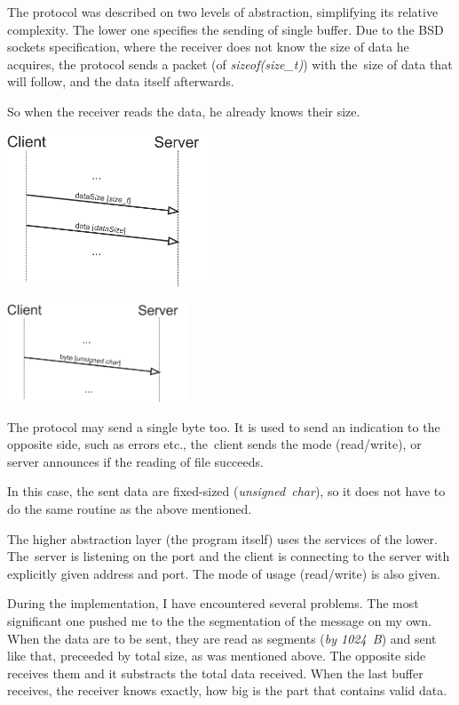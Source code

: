 \documentclass[10pt,a4paper,titlepage]{article}
\begin{document}

\begin{multicols}{2}
The protocol was described on two levels of abstraction, simplifying its
relative complexity. The lower one specifies the sending of single
buffer. Due to the BSD sockets specification, where the receiver
does not know the size of data he acquires, the protocol sends a packet
(of {\it sizeof(size\_t)}) with the~size of data that will follow,
and the data itself afterwards.

So when the receiver reads the data, he already knows their size.

\includegraphics[width=0.45\textwidth]{send_data.png}
\end{multicols}


\begin{multicols}{2}
\includegraphics[width=0.4\textwidth]{send_byte.png}

The protocol may send a single byte too. It is used to send an indication
to the opposite side, such as errors etc., the~client sends the mode
(read/write), or server announces if the reading of file succeeds.

In this case, the sent data are fixed-sized ({\it unsigned~char}),
so it does not have to do the same routine as the above mentioned.
\end{multicols}


The higher abstraction layer (the program itself) uses the services of the
lower. The~server is listening on the port and the client is connecting to the
server with explicitly given address and port. The mode of usage (read/write)
is also given.

During the implementation, I have encountered several problems. The most
significant one pushed me to the the segmentation of the message on my own.
When the data are to be sent, they are read as segments ({\it by 1024~B})
and sent like that, preceeded by total size, as was mentioned above.
The opposite side receives them and it substracts the total data received.
When the last buffer receives, the receiver knows exactly, how big is the
part that contains valid data.
\end{document}

